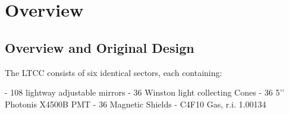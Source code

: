 \section{Overview}

\subsection{Overview and Original Design}

The LTCC consists of six identical sectors, each containing:

- 108 lightway adjustable mirrors
- 36 Winston light collecting Cones
- 36 5’’ Photonis X4500B PMT
- 36 Magnetic Shields
- C4F10 Gas, r.i. 1.00134

